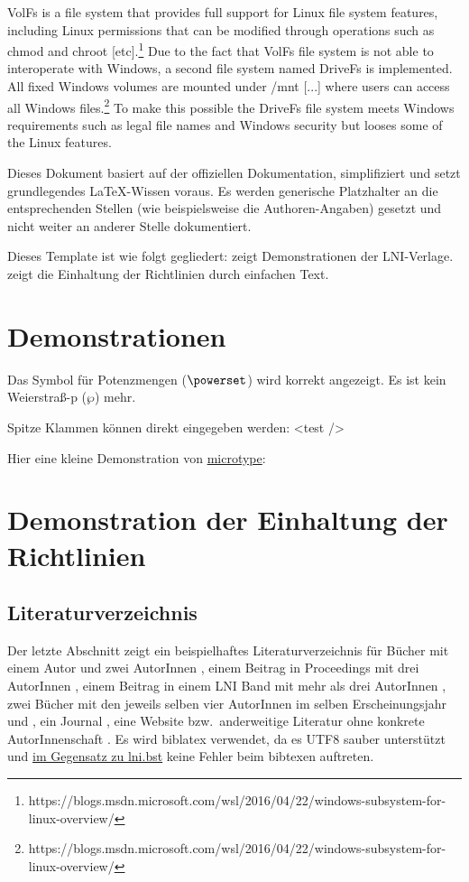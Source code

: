 \documentclass[utf8,biblatex]{lni}
\begin{document}
{\glqq VolFs is a file system that provides full support for Linux file system features, including Linux permissions that can be modified through operations such as chmod and chroot [etc].\glqq \footnote{https://blogs.msdn.microsoft.com/wsl/2016/04/22/windows-subsystem-for-linux-overview/} Due to the fact that VolFs file system is not able to interoperate with Windows, a second file system named DriveFs is implemented. \glqq All fixed Windows volumes are mounted under /mnt [...] where users can access all Windows files.\glqq \footnote{https://blogs.msdn.microsoft.com/wsl/2016/04/22/windows-subsystem-for-linux-overview/} To make this possible the DriveFs file system meets Windows requirements such as legal file names and Windows security but looses some of the Linux features.





Dieses Dokument basiert auf der offiziellen Dokumentation, simplifiziert und setzt grundlegendes LaTeX-Wissen voraus.
Es werden generische Platzhalter an die entsprechenden Stellen (wie beispielsweise die Authoren-Angaben) gesetzt und nicht weiter an anderer Stelle dokumentiert.

Dieses Template ist wie folgt gegliedert:
 zeigt Demonstrationen der LNI-Verlage.
 zeigt die Einhaltung der Richtlinien durch einfachen Text.

\section{Demonstrationen}
\label{sec:demos}
Das Symbol für Potenzmengen ($\powerset$) wird korrekt angezeigt.
Es ist kein Weierstraß-p ($\wp$) mehr.

Spitze Klammen können direkt eingegeben werden: <test />

Hier eine kleine Demonstration von \href{https://www.ctan.org/pkg/microtype}{microtype}:
\blindtext

\section{Demonstration der Einhaltung der Richtlinien}
\label{sec:lniconformance}

\subsection{Literaturverzeichnis}
Der letzte Abschnitt zeigt ein beispielhaftes Literaturverzeichnis für Bücher mit einem Autor \cite{Ez10} und zwei AutorInnen \cite{AB00}, einem Beitrag in Proceedings mit drei AutorInnen \cite{ABC01}, einem Beitrag in einem LNI Band mit mehr als drei AutorInnen \cite{Az09}, zwei Bücher mit den jeweils selben vier AutorInnen im selben Erscheinungsjahr \cite{Wa14} und \cite{Wa14b}, ein Journal \cite{Gl06}, eine Website \cite{GI14} bzw.\ anderweitige Literatur ohne konkrete AutorInnenschaft \cite{XX14}.
Es wird biblatex verwendet, da es UTF8 sauber unterstützt und \href{https://github.com/gi-ev/LNI/issues/5}{im Gegensatz zu lni.bst} keine Fehler beim bibtexen auftreten.

}
\end{document}
